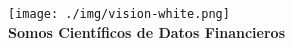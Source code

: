 \newpage

\clearpage
\thispagestyle{empty}
\addtocounter{page}{-1}
\pagecolor{titlepagecolor}
\vspace*{5cm}
\centering\texttt{[image: ./img/vision-white.png]}\\
\vspace*{1cm}
\noindent
\color{white}
\Large\textbf{Somos Científicos de Datos Financieros} 


